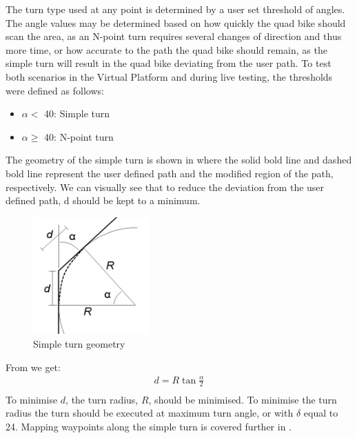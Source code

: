 \documentclass[main.tex]{subfiles}
\begin{document}
The turn type used at any point is determined by a user set threshold of angles. The angle values may be determined based on how quickly the quad bike should scan the area, as an N-point turn requires several changes of direction and thus more time, or how accurate to the path the quad bike should remain, as the simple turn will result in the quad bike deviating from the user path. To test both scenarios in the Virtual Platform and during live testing, the thresholds were defined as follows:
\begin{itemize}
\item $\alpha <$ 40\degree: Simple turn
\item $\alpha \geqslant$ 40\degree: N-point turn
\end{itemize}

The geometry of the simple turn is shown in  where the solid bold line and dashed bold line represent the user defined path and the modified region of the path, respectively. We can visually see that to reduce the deviation from the user defined path, d should be kept to a minimum.
\begin{figure}[ht]
\includegraphics[width=0.4\textwidth]{4-DetailedDesign/simpleTurnGeometry.png}
\centering
\caption{Simple turn geometry} 
\end{figure} 
From  we get:
\begin{align*}
d = R \tan{\frac{\alpha}{2}}\\
\end{align*}
To minimise $d$, the turn radius, $R$, should be minimised. To minimise the turn radius the turn should be executed at maximum turn angle, or with $\delta$ equal to 24\degree. Mapping waypoints along the simple turn is covered further in .
\end{document}
